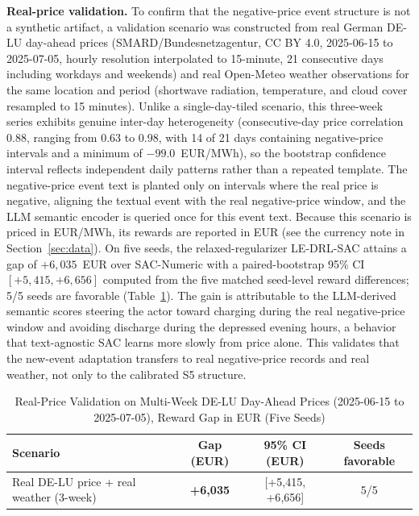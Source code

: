 \documentclass{ieeeaccess}
\begin{document}
\textbf{Real-price validation.} To confirm that the negative-price event structure is not a synthetic artifact, a validation scenario was constructed from real German DE-LU day-ahead prices (SMARD/Bundesnetzagentur, CC BY 4.0, 2025-06-15 to 2025-07-05, hourly resolution interpolated to 15-minute, 21 consecutive days including workdays and weekends) and real Open-Meteo weather observations for the same location and period (shortwave radiation, temperature, and cloud cover resampled to 15 minutes). Unlike a single-day-tiled scenario, this three-week series exhibits genuine inter-day heterogeneity (consecutive-day price correlation 0.88, ranging from 0.63 to 0.98, with 14 of 21 days containing negative-price intervals and a minimum of $-99.0$~EUR/MWh), so the bootstrap confidence interval reflects independent daily patterns rather than a repeated template. The negative-price event text is planted only on intervals where the real price is negative, aligning the textual event with the real negative-price window, and the LLM semantic encoder is queried once for this event text. Because this scenario is priced in EUR/MWh, its rewards are reported in EUR (see the currency note in Section~\ref{sec:data}). On five seeds, the relaxed-regularizer LE-DRL-SAC attains a gap of $+6{,}035$~EUR over SAC-Numeric with a paired-bootstrap 95\% CI $[+5{,}415, +6{,}656]$ computed from the five matched seed-level reward differences; 5/5 seeds are favorable (Table~\ref{tab:real_price}). The gain is attributable to the LLM-derived semantic scores steering the actor toward charging during the real negative-price window and avoiding discharge during the depressed evening hours, a behavior that text-agnostic SAC learns more slowly from price alone. This validates that the new-event adaptation transfers to real negative-price records and real weather, not only to the calibrated S5 structure.

\begin{table}[t!]
\caption{Real-Price Validation on Multi-Week DE-LU Day-Ahead Prices (2025-06-15 to 2025-07-05), Reward Gap in EUR (Five Seeds)}
\label{tab:real_price}
\centering
\begin{tabular}{lccc}
\toprule
\textbf{Scenario} & \textbf{Gap (EUR)} & \textbf{95\% CI (EUR)} & \textbf{Seeds favorable} \\
\midrule
Real DE-LU price + real weather (3-week) & \textbf{+6{,}035} & [+5{,}415, +6{,}656] & 5/5 \\
\bottomrule
\end{tabular}
\end{table}
\end{document}
